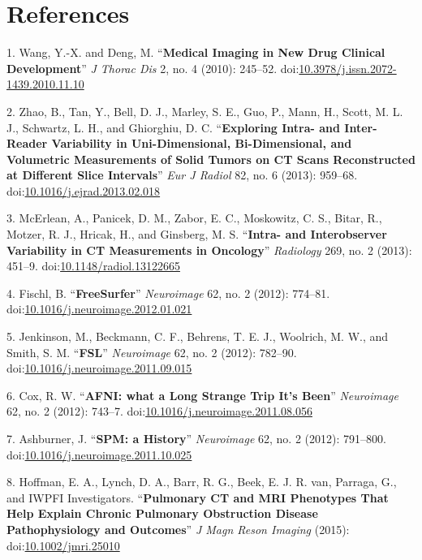 \documentclass[11pt,]{article}
\begin{document}
\clearpage

\newpage

\section*{References}\label{references}

1. Wang, Y.-X. and Deng, M. ``\textbf{Medical Imaging in New Drug
Clinical Development}'' \emph{J Thorac Dis} 2, no. 4 (2010): 245--52.
doi:\href{http://dx.doi.org/10.3978/j.issn.2072-1439.2010.11.10}{10.3978/j.issn.2072-1439.2010.11.10}

2. Zhao, B., Tan, Y., Bell, D. J., Marley, S. E., Guo, P., Mann, H.,
Scott, M. L. J., Schwartz, L. H., and Ghiorghiu, D. C.
``\textbf{Exploring Intra- and Inter-Reader Variability in
Uni-Dimensional, Bi-Dimensional, and Volumetric Measurements of Solid
Tumors on CT Scans Reconstructed at Different Slice Intervals}''
\emph{Eur J Radiol} 82, no. 6 (2013): 959--68.
doi:\href{http://dx.doi.org/10.1016/j.ejrad.2013.02.018}{10.1016/j.ejrad.2013.02.018}

3. McErlean, A., Panicek, D. M., Zabor, E. C., Moskowitz, C. S., Bitar,
R., Motzer, R. J., Hricak, H., and Ginsberg, M. S. ``\textbf{Intra- and
Interobserver Variability in CT Measurements in Oncology}''
\emph{Radiology} 269, no. 2 (2013): 451--9.
doi:\href{http://dx.doi.org/10.1148/radiol.13122665}{10.1148/radiol.13122665}

4. Fischl, B. ``\textbf{FreeSurfer}'' \emph{Neuroimage} 62, no. 2
(2012): 774--81.
doi:\href{http://dx.doi.org/10.1016/j.neuroimage.2012.01.021}{10.1016/j.neuroimage.2012.01.021}

5. Jenkinson, M., Beckmann, C. F., Behrens, T. E. J., Woolrich, M. W.,
and Smith, S. M. ``\textbf{FSL}'' \emph{Neuroimage} 62, no. 2 (2012):
782--90.
doi:\href{http://dx.doi.org/10.1016/j.neuroimage.2011.09.015}{10.1016/j.neuroimage.2011.09.015}

6. Cox, R. W. ``\textbf{AFNI: what a Long Strange Trip It's Been}''
\emph{Neuroimage} 62, no. 2 (2012): 743--7.
doi:\href{http://dx.doi.org/10.1016/j.neuroimage.2011.08.056}{10.1016/j.neuroimage.2011.08.056}

7. Ashburner, J. ``\textbf{SPM: a History}'' \emph{Neuroimage} 62, no. 2
(2012): 791--800.
doi:\href{http://dx.doi.org/10.1016/j.neuroimage.2011.10.025}{10.1016/j.neuroimage.2011.10.025}

8. Hoffman, E. A., Lynch, D. A., Barr, R. G., Beek, E. J. R. van,
Parraga, G., and IWPFI Investigators. ``\textbf{Pulmonary CT and MRI
Phenotypes That Help Explain Chronic Pulmonary Obstruction Disease
Pathophysiology and Outcomes}'' \emph{J Magn Reson Imaging} (2015):
doi:\href{http://dx.doi.org/10.1002/jmri.25010}{10.1002/jmri.25010}
\end{document}
